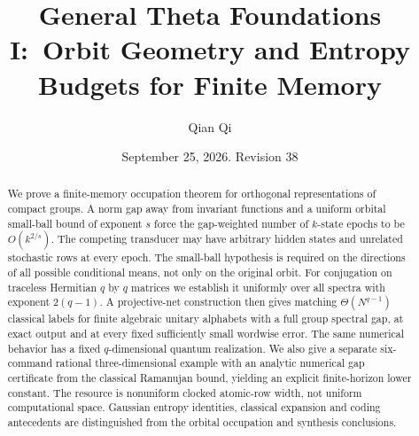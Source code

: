 \documentclass[11pt]{amsart}
\title[Orbit geometry and finite memory]{General Theta Foundations I:\
Orbit Geometry and Entropy Budgets for Finite Memory}
\author{Qian Qi}
\date{September 25, 2026. Revision 38}
\theoremstyle{definition}\newtheorem{definition}[theorem]{Definition}
\theoremstyle{remark}\newtheorem{remark}[theorem]{Remark}
\begin{document}
\begin{abstract}
We prove a finite-memory occupation theorem for orthogonal representations
of compact groups. A norm gap away from invariant functions and a uniform
orbital small-ball bound of exponent $s$ force the gap-weighted number of
$k$-state epochs to be $O(k^{2/s})$. The competing transducer may have
arbitrary hidden states and unrelated stochastic rows at every epoch.
The small-ball hypothesis is required on the directions of all possible
conditional means, not only on the original orbit. For conjugation on
traceless Hermitian $q$ by $q$ matrices we establish it uniformly over all
spectra with exponent $2(q-1)$. A projective-net construction then gives
matching $\Theta(N^{q-1})$ classical labels for finite algebraic unitary
alphabets with a full group spectral gap, at exact output and at every
fixed sufficiently small wordwise error. The same numerical behavior
has a fixed $q$-dimensional quantum realization. We also give a separate
six-command rational three-dimensional example with an analytic numerical
gap certificate from the classical Ramanujan bound, yielding an explicit
finite-horizon lower constant. The resource is nonuniform clocked
atomic-row width, not uniform computational space. Gaussian entropy
identities, classical expansion and coding antecedents are distinguished
from the orbital occupation and synthesis conclusions.
\end{abstract}
\maketitle








\end{document}
